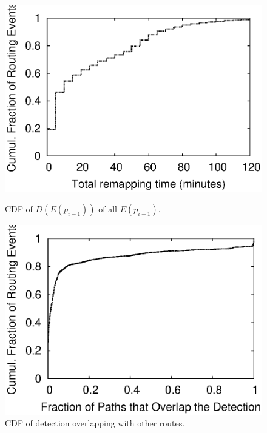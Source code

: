 \begin{figure}
\vspace{5mm}
\begin{minipage}{0.32\textwidth}
\includegraphics[width=1.05\columnwidth]{figs/patching/durationdetection/durationdetection.eps}
\caption{CDF of $D(E(p_{i-1}))$ of all $E(p_{i-1})$.}
\label{fig:overlap.delay.cdf}
%
\end{minipage}
\hfill
\begin{minipage}{0.32\textwidth}
\includegraphics[width=1.05\columnwidth]{figs/patching/routesoverlapping/routesoverlapping.eps}
\caption{CDF of detection overlapping with other routes.}
\label{fig:overlap.quantity.cdf}
\end{minipage}
%
\hfill
\begin{minipage}{0.32\textwidth}

\end{minipage}
\end{figure}
